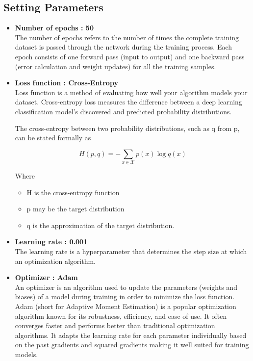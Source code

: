 	\subsection{Setting Parameters}
	\begin{itemize}
		\item \textbf{Number of epochs : 50} \\
			The number of epochs refers to the number of times the complete training dataset is passed through the network during the training process. Each epoch consists of one forward pass (input to output) and one backward pass (error calculation and weight updates) for all the training samples.
		\item \textbf{Loss function : Cross-Entropy}\cite{mao2023crossentropy} \\
			Loss function is a method of evaluating how well your algorithm models your dataset. Cross-entropy loss measures the difference between a deep learning classification model's discovered and predicted probability distributions.

			The cross-entropy between two probability distributions, such as q from p, can be stated formally as
			
			\begin{equation}
				H(p, q) = -\sum_{x \in \mathcal{X}} p(x) \log q(x)
			\end{equation}

			Where
			\begin{itemize}
				\item H is the cross-entropy function
				\item p may be the target distribution
				\item q is the approximation of the target distribution.
			\end{itemize} 

		\item \textbf{Learning rate : 0.001} \\
			The learning rate is a hyperparameter that determines the step size at which an optimization algorithm.
		\item \textbf{Optimizer : Adam} \cite{kingma2017adam}\\
			An optimizer  is an algorithm used to update the parameters (weights and biases) of a model during training in order to minimize the loss function. 
			Adam (short for Adaptive Moment Estimation) is a popular optimization algorithm known for its robustness, efficiency, and ease of use. It often converges faster and performs better than traditional optimization algorithms.
			It adapts the learning rate for each parameter individually based on the past gradients and squared gradients making it well suited for training models.
	\end{itemize}
\pagebreak
